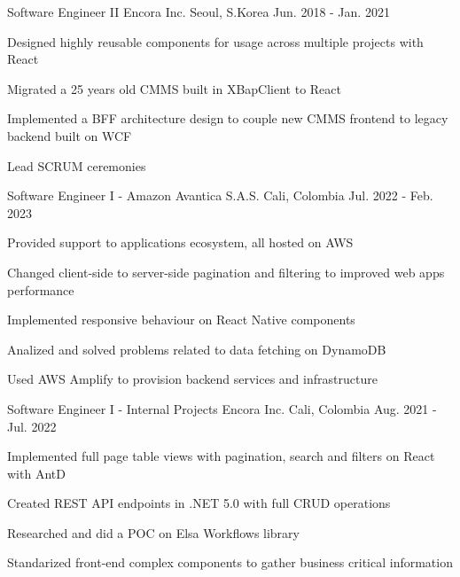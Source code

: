 

\begin{cventries}

  \cventry
    {Software Engineer II} %
    {Encora Inc.} %
    {Seoul, S.Korea} %
    {Jun. 2018 - Jan. 2021} %
    {
      \begin{cvitems} %
        \item {Designed highly reusable components for usage across multiple projects with React}
        \item {Migrated a 25 years old CMMS built in XBapClient to React}
        \item {Implemented a BFF architecture design to couple new CMMS frontend to legacy backend built on WCF}
        \item {Lead SCRUM ceremonies}
      \end{cvitems}
    }

  \cventry
  {Software Engineer I - Amazon} %
  {Avantica S.A.S.} %
  {Cali, Colombia} %
  {Jul. 2022 - Feb. 2023} %
  {
    \begin{cvitems} %
      \item {Provided support to applications ecosystem, all hosted on AWS}
      \item {Changed client-side to server-side pagination and filtering to improved web apps performance}
      \item {Implemented responsive behaviour on React Native components}
      \item {Analized and solved problems related to data fetching on DynamoDB}
      \item {Used AWS Amplify to provision backend services and infrastructure}
    \end{cvitems}
  }

\cventry
{Software Engineer I - Internal Projects} %
{Encora Inc.} %
{Cali, Colombia} %
{Aug. 2021 - Jul. 2022} %
{
  \begin{cvitems} %
    \item {Implemented full page table views with pagination, search and filters on React with AntD}
    \item {Created REST API endpoints in .NET 5.0 with full CRUD operations}
    \item {Researched and did a POC on Elsa Workflows library}
    \item {Standarized front-end complex components to gather business critical information}
  \end{cvitems}
}


\end{cventries}
